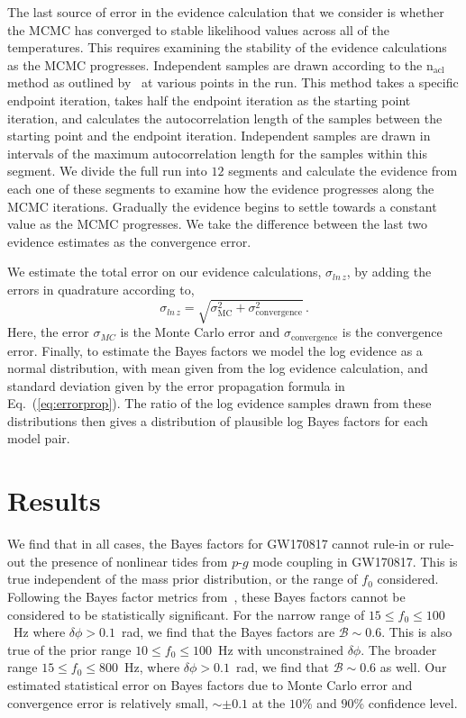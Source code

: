 The last source of error in the evidence calculation that we consider is whether the MCMC has converged to stable likelihood values across all of the temperatures. This requires examining the stability of the evidence calculations as the MCMC progresses. Independent samples are drawn according to the $\mathrm{n_{acl}}$ method as outlined by~\cite{biwer2019pycbc} at various points in the run. This method takes a specific endpoint iteration, takes half the endpoint iteration as the starting point iteration, and calculates the autocorrelation length of the samples between the starting point and the endpoint iteration. Independent samples are drawn in intervals of the maximum autocorrelation length for the samples within this segment. We divide the full run into $12$ segments and calculate the evidence from each one of these segments to examine how the evidence progresses along the MCMC iterations. Gradually the evidence begins to settle towards a constant value as the MCMC progresses. We take the difference between the last two evidence estimates as the convergence error.

We estimate the total error on our evidence calculations, $\sigma_{ln \, z}$, by adding the errors in quadrature according to,
\begin{equation}
\sigma_{ln \, z} = \sqrt{ \sigma_{\mathrm{MC}}^2 + \sigma_{\mathrm{convergence}}^2 } \, .
\label{eq:errorprop}
\end{equation}
Here, the error $\sigma_{MC}$ is the Monte Carlo error and $\sigma_{\mathrm{convergence}}$ is the convergence error. Finally, to estimate the Bayes factors we model the log evidence as a normal distribution, with mean given from the log evidence calculation, and standard deviation given by the error propagation formula in Eq.~(\ref{eq:errorprop}). The ratio of the log evidence samples drawn from these distributions then gives a distribution of plausible log Bayes factors for each model pair.

\section{Results}
\label{sec:results}
We find that in all cases, the Bayes factors for GW170817 cannot rule-in or rule-out the presence of nonlinear tides from $p$-$g$ mode coupling in GW170817. This is true independent of the mass prior distribution, or the range of $f_0$ considered. Following the Bayes factor metrics from~\cite{kass1995bayes, jeffreys1998theory}, these Bayes factors cannot be considered to be statistically significant. For the narrow range of $15 \le f_0 \le 100$~Hz where $\delta \phi > 0.1$~rad, we find that the Bayes factors are $\mathcal{B} \sim 0.6$. This is also true of the prior range $10 \le f_0 \le 100$~Hz with unconstrained $\delta \phi$. The broader range  $15 \le f_0 \le 800$~Hz, where $\delta \phi > 0.1$~rad, we find that $\mathcal{B} \sim 0.6$ as well. Our estimated statistical error on Bayes factors due to Monte Carlo error and convergence error is relatively small, $\sim \pm 0.1$ at the $10$\% and $90$\% confidence level.

